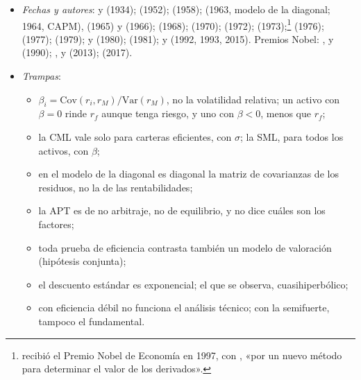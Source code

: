 \documentclass[11pt]{article}
\begin{document}
\begin{itemize}
\item \emph{Fechas y autores}:  y  (1934);  (1952);  (1958);  (1963, modelo de la diagonal; 1964, CAPM),  (1965) y  (1966);  (1968);  (1970);  (1972);  (1973);\footnote{ recibió el Premio Nobel de Economía en 1997, con , «por un nuevo método para determinar el valor de los derivados»\nocite{Nobel1997Prensa}.}  (1976);  (1977);  (1979);  y  (1980);  (1981);  y  (1992, 1993, 2015). Premios Nobel: ,  y  (1990); ,  y  (2013);  (2017).
\item \emph{Trampas}:
  \begin{itemize}
  \item $\beta_i=\mathrm{Cov}(r_i,r_M)/\mathrm{Var}(r_M)$, no la volatilidad relativa; un activo con $\beta=0$ rinde $r_f$ aunque tenga riesgo, y uno con $\beta<0$, menos que $r_f$;
  \item la CML vale solo para carteras eficientes, con $\sigma$; la SML, para todos los activos, con $\beta$;
  \item en el modelo de la diagonal es diagonal la matriz de covarianzas de los residuos, no la de las rentabilidades;
  \item la APT es de no arbitraje, no de equilibrio, y no dice cuáles son los factores;
  \item toda prueba de eficiencia contrasta también un modelo de valoración (hipótesis conjunta);
  \item el descuento estándar es exponencial; el que se observa, cuasihiperbólico;
  \item con eficiencia débil no funciona el análisis técnico; con la semifuerte, tampoco el fundamental.
  \end{itemize}
\end{itemize}

\bibliografia
\end{document}
